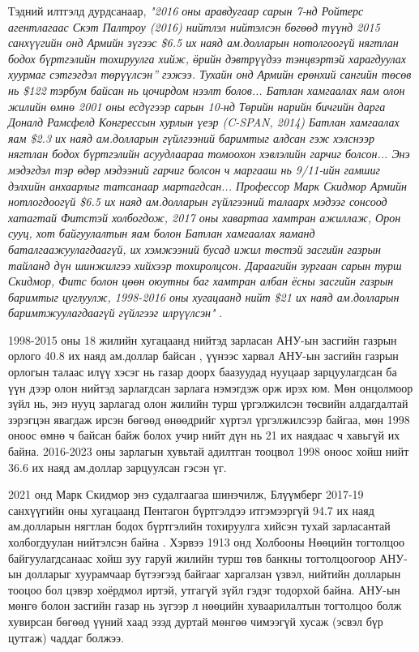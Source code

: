 \documentclass[10pt,twocolumn,letterpaper]{article}
\begin{document}
Тэдний илтгэлд дурдсанаар, \textit{"2016 оны аравдугаар сарын 7-нд Ройтерс агентлагаас Скэт Палтроу (2016) нийтлэл нийтэлсэн бөгөөд түүнд 2015 санхүүгийн онд Армийн зүгээс \$6.5 их наяд ам.долларын нотолгоогүй нягтлан бодох бүртгэлийн тохируулга хийж, \"өрийн дэвтрүүдээ тэнцвэртэй харагдуулах хуурмаг сэтгэгдэл төрүүлсэн” гэжээ. Тухайн онд Армийн ерөнхий сангийн төсөв нь \$122 тэрбум байсан нь цочирдом нээлт болов... Батлан хамгаалах яам олон жилийн өмнө 2001 оны есдүгээр сарын 10-нд Төрийн нарийн бичгийн дарга Доналд Рамсфелд Конгрессын хурлын үеэр (C-SPAN, 2014) Батлан хамгаалах яам \$2.3 их наяд ам.долларын гүйлгээний баримтыг алдсан гэж хэлснээр нягтлан бодох бүртгэлийн асуудлаараа томоохон хэвлэлийн гарчиг болсон... Энэ мэдэгдэл тэр өдөр мэдээний гарчиг болсон ч маргааш нь 9/11-ийн гамшиг дэлхийн анхаарлыг татсанаар мартагдсан... Профессор Марк Скидмор Армийн нотлогдоогүй \$6.5 их наяд ам.долларын гүйлгээний талаарх мэдээг сонсоод хатагтай Фитстэй холбогдож, 2017 оны хавартаа хамтран ажиллаж, Орон сууц, хот байгуулалтын яам болон Батлан хамгаалах яаманд баталгаажуулагдаагүй, их хэмжээний бусад ижил төстэй засгийн газрын тайланд дүн шинжилгээ хийхээр тохиролцсон. Дараагийн зургаан сарын турш Скидмор, Фитс болон цөөн оюутны баг хамтран албан ёсны засгийн газрын баримтыг цуглуулж, 1998-2016 оны хугацаанд нийт \$21 их наяд ам.долларын баримтжуулагдаагүй гүйлгээг илрүүлсэн"} \cite{12}.

1998-2015 оны 18 жилийн хугацаанд нийтэд зарласан АНУ-ын засгийн газрын орлого 40.8 их наяд ам.доллар байсан \cite{15}, үүнээс харвал АНУ-ын засгийн газрын орлогын талаас илүү хэсэг нь газар доорх баазуудад нууцаар зарцуулагдсан ба үүн дээр олон нийтэд зарлагдсан зарлага нэмэгдэж орж ирэх юм. Мөн онцолмоор зүйл нь, энэ нууц зарлагад олон жилийн турш үргэлжилсэн төсвийн алдагдалтай зэрэгцэн явагдаж ирсэн бөгөөд өнөөдрийг хүртэл үргэлжилсээр байгаа, мөн 1998 оноос өмнө ч байсан байж болох учир нийт дүн нь 21 их наядаас ч хавьгүй их байна. 2016-2023 оны зарлагын хувьтай адилтган тооцвол 1998 оноос хойш нийт 36.6 их наяд ам.доллар зарцуулсан гэсэн үг.

2021 онд Марк Скидмор энэ судалгаагаа шинэчилж, Блүүмберг 2017-19 санхүүгийн оны хугацаанд Пентагон бүртгэлдээ итгэмээргүй 94.7 их наяд ам.долларын нягтлан бодох бүртгэлийн тохируулга хийсэн тухай зарласантай холбогдуулан нийтэлсэн байна \cite{17,18}. Хэрвээ 1913 онд Холбооны Нөөцийн тогтолцоо байгуулагдсанаас хойш зуу гаруй жилийн турш төв банкны тогтолцоогоор АНУ-ын долларыг хуурамчаар бүтээгээд байгааг харгалзан үзвэл, нийтийн долларын тооцоо бол цэвэр хоёрдмол иртэй, утгагүй зүйл гэдэг тодорхой байна. АНУ-ын мөнгө болон засгийн газар нь зүгээр л нөөцийн хуваарилалтын тогтолцоо болж хувирсан бөгөөд үүний хаад эзэд дуртай мөнгөө чимээгүй хусаж (эсвэл бүр цутгаж) чаддаг болжээ.
\end{document}
